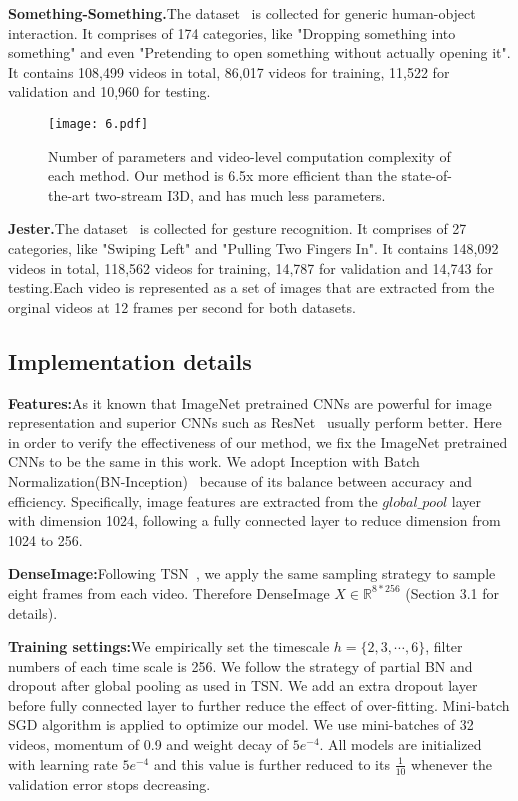 \documentclass{article}
\begin{document}
\textbf{Something-Something.}The dataset~\cite{GoyalKMMWKHFYMH17} is collected for generic human-object interaction. It comprises of 174 categories, like "Dropping something into something" and even "Pretending to open something without actually opening it". It contains 108,499 videos in total, 86,017 videos for training, 11,522 for validation and 10,960 for testing.
\begin{figure*}[t]
	\begin{center}
		\texttt{[image: 6.pdf]}
		\caption{Number of parameters and video-level computation complexity of each method. Our method is 6.5x more efficient than the state-of-the-art two-stream I3D, and has much less parameters.}
		\label{Figure 5.}
	\end{center}
	\vspace{-0.5em}
\end{figure*}

\textbf{Jester.}The dataset~\cite{jester} is collected for gesture recognition. It comprises of 27 categories, like "Swiping Left" and "Pulling Two Fingers In". It contains 148,092 videos in total, 118,562 videos for training, 14,787 for validation and 14,743 for testing.Each video is represented as a set of images that are extracted from the orginal videos at 12 frames per second for both datasets.

\subsection{Implementation details}

\textbf{Features:}As it known that ImageNet pretrained CNNs are powerful for image representation and superior CNNs such as ResNet~\cite{HeZRS16} usually perform better. Here in order to verify the effectiveness of our method, we fix the ImageNet pretrained CNNs to be the same in this work. We adopt Inception with Batch Normalization(BN-Inception)~\cite{IoffeS15} because of its balance between accuracy and efficiency. Specifically, image features are extracted from the $global\_pool$ layer with dimension 1024, following a fully connected layer to reduce dimension from 1024 to 256.

\textbf{DenseImage:}Following TSN~\cite{WangXW0LTG16}, we apply the same sampling strategy to sample eight frames from each video. Therefore DenseImage $X\in \mathbb{R}^{8*256}$ (Section 3.1 for details).

\textbf{Training settings:}We empirically set the timescale $h=\{2,3,\cdots,6\}$, filter numbers of each time scale is 256. We follow the strategy of partial BN and dropout after global pooling as used in TSN. We add an extra dropout layer before fully connected layer to further reduce the effect of over-fitting. Mini-batch SGD algorithm is applied to optimize our model. We use mini-batches of 32 videos, momentum of 0.9 and weight decay of $5e^{-4}$. All models are initialized with learning rate $5e^{-4}$ and this value is further reduced to its $\frac{1}{10}$ whenever the validation error stops decreasing.
\end{document}
